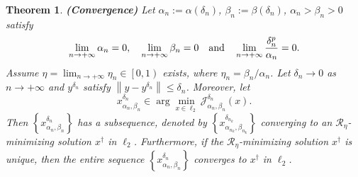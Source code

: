 \documentclass[a4paper,12pt]{article}
\newtheorem{theorem}{Theorem}[section]
\numberwithin{equation}{section}
\begin{document}
\begin{theorem}\label{the2.8}
    \textbf{(Convergence)} Let $\alpha_{n}:=\alpha\left(\delta_{n}\right)$, $\beta_{n}:=\beta\left(\delta_{n}\right)$, $\alpha_{n}>\beta_{n}> 0$ satisfy
    \begin{equation*}
        \lim_{n\rightarrow +\infty}\alpha_{n}=0,\quad \lim_{n\rightarrow +\infty}\beta_{n}=0\quad {\rm and} \quad \lim_{n\rightarrow +\infty}\frac{\delta_{n}^{p}}{\alpha_{n}}=0.
    \end{equation*}
    Assume $\eta=\lim_{n\rightarrow +\infty}\eta_{n}\in\left[0,1\right)$ exists, where $\eta_{n}=\beta_{n}/\alpha_{n}$. Let $\delta_{n}\rightarrow 0$ as $n\rightarrow +\infty$ and $y^{\delta_{n}}$ satisfy $\left\|y-y^{\delta_{n}}\right\|\leq\delta_{n}$. Moreover, let
    \begin{equation*}
        x_{\alpha_{n},\beta_{n}}^{\delta_{n}}\in \arg\min_{x\in\ell_{2}} \mathcal{J}_{\alpha_{n},\beta_{n}}^{\delta_{n}}\left(x\right).
    \end{equation*}
    Then $\left\{x_{\alpha_{n},\beta_{n}}^{\delta_{n}}\right\}$ has a subsequence, denoted by $\left\{x_{\alpha_{n_{k}},\beta_{n_{k}}}^{\delta_{n_{k}}}\right\}$ converging to an $\mathcal{R}_{\eta}$-minimizing solution $x^{\dagger}$ in $\ell_{2}$. Furthermore, if the $\mathcal{R}_{\eta}$-minimizing solution $x^{\dagger}$ is unique, then the entire sequence $\left\{x_{\alpha_{n},\beta_{n}}^{\delta_{n}}\right\}$ converges to $x^{\dagger}$ in $\ell_{2}$.
\end{theorem}
\end{document}
